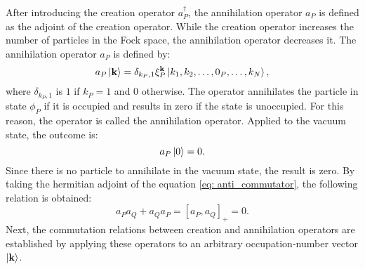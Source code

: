 After introducing the creation operator $a_P^{\dagger}$, the annihilation operator $a_P$ is defined as the adjoint of the creation operator. While the creation operator increases the number of particles in the Fock space, the annihilation operator decreases it. 
The annihilation operator $a_P$ is defined by:
\begin{equation}
    a_P \ket{\mathbf{k}} = \delta_{k_P, 1} \xi_P^{\mathbf{k}} \ket{k_1, k_2, \ldots, 0_P, \ldots, k_N}, \label{eq: annihilation_operator}
\end{equation}
where $\delta_{k_P, 1}$ is $1$ if $k_P = 1$ and $0$ otherwise. The operator annihilates the particle in state $\phi_P$ if it is occupied and results in zero if the state is unoccupied. For this reason, the operator is called the annihilation operator. 
Applied to the vacuum state, the outcome is:
\begin{equation}
    a_P \ket{0} = 0.
\end{equation}
Since there is no particle to annihilate in the vacuum state, the result is zero.
By taking the hermitian adjoint of the equation \eqref{eq: anti_commutator}, the following relation is obtained:
\begin{equation}
    a_P a_Q + a_Q a_P = \left [ a_P, a_Q \right ]_+ = 0.
\end{equation}
Next, the commutation relations between creation and annihilation operators are established by applying these operators to an arbitrary occupation-number vector $\ket{\textbf{k}}$.

